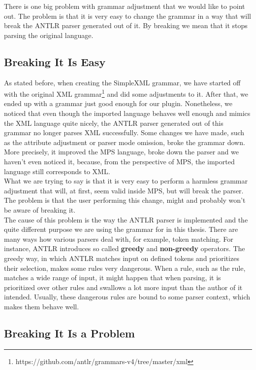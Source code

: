 There is one big problem with grammar adjustment that we would like to point out.
The problem is that it is very easy to change the grammar in a way that will break the ANTLR parser generated out of it.
By breaking we mean that it stops parsing the original language.

\subsection{Breaking It Is Easy}

As stated before, when creating the SimpleXML grammar, we have started off with the original XML grammar\footnote{https://github.com/antlr/grammars-v4/tree/master/xml} and did some adjustments to it.
After that, we ended up with a grammar just good enough for our plugin.
Nonetheless, we noticed that even though the imported language behaves well enough and mimics the XML language quite nicely, the ANTLR parser generated out of this grammar no longer parses XML successfully.
Some changes we have made, such as the attribute adjustment or parser mode omission, broke the grammar down.
More precisely, it improved the MPS language, broke down the parser and we haven't even noticed it, because, from the perspective of MPS, the imported language still corresponds to XML.
\\

What we are trying to say is that it is very easy to perform a harmless grammar adjustment that will, at first, seem valid inside MPS, but will break the parser.
The problem is that the user performing this change, might and probably won't be aware of breaking it.
\\

The cause of this problem is the way the ANTLR parser is implemented and the quite different purpose we are using the grammar for in this thesis.
There are many ways how various parsers deal with, for example, token matching.
For instance, ANTLR introduces so called \textbf{greedy} and \textbf{non-greedy} operators.
The greedy way, in which ANTLR matches input on defined tokens and prioritizes their selection, makes some rules very dangerous.
When a rule, such as the  rule, matches a wide range of input, it might happen that when parsing, it is prioritized over other rules and swallows a lot more input than the author of it intended.
Usually, these dangerous rules are bound to some parser context, which makes them behave well.

\subsection{Breaking It Is a Problem}

